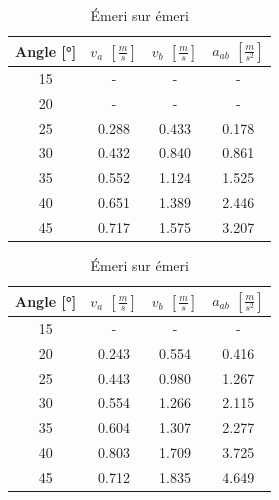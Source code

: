 \documentclass[twoside,twocolumn]{article}
\begin{document}
\begin{table}[H]
\centering
\caption{Plastique sur plastique}
\begin{tabular}{|c|c|c|c|}
\hline
Angle [°] &$v_a$ $\left[ \frac{m}{s} \right]$ & $v_b$ $\left[ \frac{m}{s} \right]$ & $a_{ab}$ $\left[ \frac{m}{s^2} \right]$ \\
           \hline \hline
15        &- & - & - \\
           \hline
20        &- & - & - \\
           \hline
25        &0.288 & 0.433 & 0.178 \\
           \hline
30        &0.432 & 0.840 & 0.861 \\
           \hline
35        &0.552 & 1.124 & 1.525 \\
           \hline
40        &0.651 & 1.389 & 2.446 \\
           \hline
45        &0.717 & 1.575 & 3.207 \\
           \hline
\end{tabular}
\label{table:v-app}

\caption{Émeri sur émeri}
\begin{tabular}{|c|c|c|c|}
\hline
Angle [°] &$v_a$ $\left[ \frac{m}{s} \right]$ & $v_b$ $\left[ \frac{m}{s} \right]$ & $a_{ab}$ $\left[ \frac{m}{s^2} \right]$ \\
           \hline \hline
15        &- & - & - \\
           \hline
20        &0.243 & 0.554 & 0.416 \\
           \hline
25        &0.443 & 0.980 & 1.267 \\
           \hline
30        &0.554 & 1.266 & 2.115 \\
           \hline
35        &0.604 & 1.307 & 2.277 \\
           \hline
40        &0.803 & 1.709 & 3.725 \\
           \hline
45        &0.712 & 1.835 & 4.649 \\
           \hline
\end{tabular}
\label{table:v-aee}
\end{table}
\end{document}
